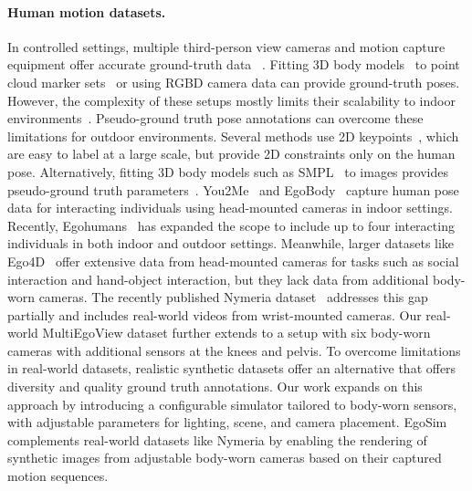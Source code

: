 \paragraph{Human motion datasets.}
In controlled settings, multiple third-person view cameras and motion capture equipment offer accurate ground-truth data ~\cite{amass,panoptic,bhatnagar2022behave, huang2022contact, hassan2019ambiguities, cai2022humman}.
Fitting 3D body models~\cite{SMPL:2015,SMPL-X:2019,STAR:2020} to point cloud marker sets~\cite{amass} or using RGBD camera data can provide ground-truth poses.
However, the complexity of these setups mostly limits their scalability to indoor environments~\cite{rhodin2016egocap, zhao2021egoglass, zhang2022egobody}.
Pseudo-ground truth pose annotations can overcome these limitations for outdoor environments.
Several methods use 2D keypoints~\cite{andriluka2014humanpose, iqbal2017posetrack, martinmartin2021jrdb}, which are easy to label at a large scale, but provide 2D constraints only on the human pose. Alternatively, fitting 3D body models such as SMPL~\cite{SMPL:2015} to images provides pseudo-ground truth parameters~\cite{moon2022neuralannot,kolotouros2019reconstruct,joo2020posefitting}.
% 
You2Me~\cite{ng2020you2me} and EgoBody~\cite{zhang2022egobody} capture human pose data for interacting individuals using head-mounted cameras in indoor settings.
Recently, Egohumans~\cite{khirodkar2023egohumans} has expanded the scope to include up to four interacting individuals in both indoor and outdoor settings.
Meanwhile, larger datasets like Ego4D~\cite{grauman2022ego4d, graumanEgoExo4DUnderstandingSkilled2024apr} offer extensive data from head-mounted cameras for tasks such as social interaction and hand-object interaction, but they lack data from additional body-worn cameras. %
The recently published Nymeria dataset~\cite{maNymeriaMassiveCollection2024sep} addresses this gap partially and includes real-world videos from wrist-mounted cameras.
Our real-world MultiEgoView dataset further extends to a setup with six body-worn cameras with additional sensors at the knees and pelvis.
To overcome limitations in real-world datasets, realistic synthetic datasets offer an alternative that offers diversity and quality ground truth annotations\cite{bedlam, yang2023synbody, akada2022unrealego}.
Our work expands on this approach by introducing a configurable simulator tailored to body-worn sensors, with adjustable parameters for lighting, scene, and camera placement.
EgoSim complements real-world datasets like Nymeria by enabling the rendering of synthetic images from adjustable body-worn cameras based on their captured motion sequences. 

